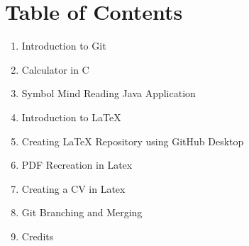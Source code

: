 \chapter*{Table of Contents}
\thispagestyle{empty}

\begin{enumerate}
    \item Introduction to Git
    \item Calculator in C
    \item Symbol Mind Reading Java Application
    \item Introduction to LaTeX
    \item Creating LaTeX Repository using GitHub Desktop
    \item PDF Recreation in Latex
    \item Creating a CV in Latex
    \item Git Branching and Merging
    \item Credits
\end{enumerate}
